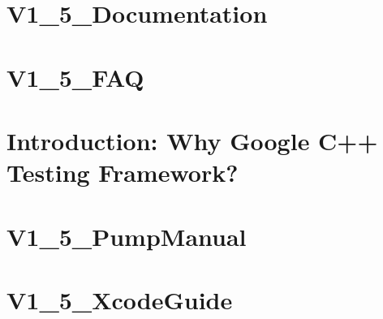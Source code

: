 \documentclass[twoside]{book}
\newcommand{\+}{\discretionary{\mbox{\scriptsize$\hookleftarrow$}}{}{}}
\begin{document}
\chapter{V1\+\_\+5\+\_\+\+Documentation}
\label{md___users_fjp_git_bachelor_bachelor-master_updated_vfinal_googletest-1_88_80_googletest_docs__v1_5__documentation}

\chapter{V1\+\_\+5\+\_\+\+F\+AQ}
\label{md___users_fjp_git_bachelor_bachelor-master_updated_vfinal_googletest-1_88_80_googletest_docs__v1_5__f_a_q}

\chapter{Introduction\+: Why Google C++ Testing Framework?}
\label{md___users_fjp_git_bachelor_bachelor-master_updated_vfinal_googletest-1_88_80_googletest_docs__v1_5__primer}

\chapter{V1\+\_\+5\+\_\+\+Pump\+Manual}
\label{md___users_fjp_git_bachelor_bachelor-master_updated_vfinal_googletest-1_88_80_googletest_docs__v1_5__pump_manual}

\chapter{V1\+\_\+5\+\_\+\+Xcode\+Guide}
\label{md___users_fjp_git_bachelor_bachelor-master_updated_vfinal_googletest-1_88_80_googletest_docs__v1_5__xcode_guide}

\end{document}
